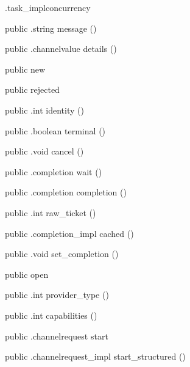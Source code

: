 \begin{CrexxClass}{.task\_impl}{concurrency}
\begin{Members}
    \Method
      {public}
      {.string}
      {message}
      {()}

    \Method
      {public}
      {.channelvalue}
      {details}
      {()}

    \Factory
      {public}
      {new}
      {}

    \Factory
      {public}
      {rejected}
      {}

    \Method
      {public}
      {.int}
      {identity}
      {()}

    \Method
      {public}
      {.boolean}
      {terminal}
      {()}

    \Method
      {public}
      {.void}
      {cancel}
      {()}

    \Method
      {public}
      {.completion}
      {wait}
      {()}

    \Method
      {public}
      {.completion}
      {completion}
      {()}

    \Method
      {public}
      {.int}
      {raw\_ticket}
      {()}

    \Method
      {public}
      {.completion\_impl}
      {cached}
      {()}

    \Method
      {public}
      {.void}
      {set\_completion}
      {()}

    \Factory
      {public}
      {open}
      {}

    \Method
      {public}
      {.int}
      {provider\_type}
      {()}

    \Method
      {public}
      {.int}
      {capabilities}
      {()}

    \Method
      {public}
      {.channelrequest}
      {start}
      {}

    \Method
      {public}
      {.channelrequest\_impl}
      {start\_structured}
      {()}


\end{Members}
\end{CrexxClass}
